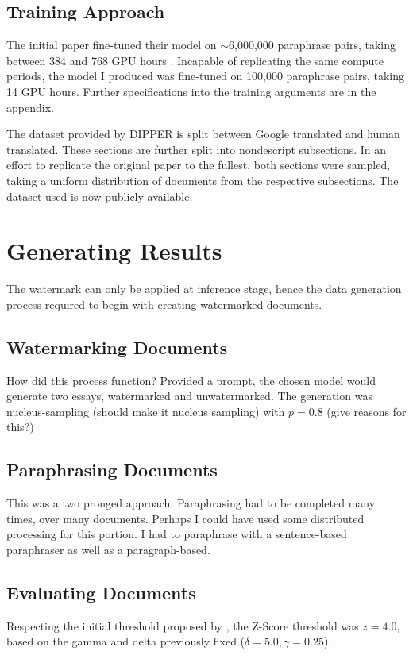 \documentclass{l4proj}
\theoremstyle{definition}
\begin{document}
    \subsection{Training Approach}
        The initial paper fine-tuned their model on $\sim$6,000,000 paraphrase pairs, taking between 384 and 768 GPU hours \citep{krishna2023paraphrasing}. Incapable of replicating the same compute periods, the model I produced was fine-tuned on 100,000 paraphrase pairs, taking 14 GPU hours.
        Further specifications into the training arguments are in the appendix. %

        The dataset provided by DIPPER is split between Google translated and human translated. These sections are further split into nondescript subsections. In an effort to replicate the original paper to the fullest, both sections were sampled, taking a uniform distribution of documents from the respective subsections. 
        The dataset used is now publicly available.
        
\section{Generating Results} %
    The watermark can only be applied at inference stage, hence the data generation process required to begin with creating watermarked documents. 

    \subsection{Watermarking Documents}
        How did this process function? Provided a prompt, the chosen model would generate two essays, watermarked and unwatermarked. The generation was nucleus-sampling (should make it nucleus sampling) with $p = 0.8$ (give reasons for this?) \newline 

    \subsection{Paraphrasing Documents}
        This was a two pronged approach. Paraphrasing had to be completed many times, over many documents. Perhaps I could have used some distributed processing for this portion. 
        I had to paraphrase with a sentence-based paraphraser as well as a paragraph-based.

    \subsection{Evaluating Documents}
        Respecting the initial threshold proposed by \citet{kirchenbauer2023watermark}, the Z-Score threshold was $z = 4.0$, based on the gamma and delta previously fixed ($\delta = 5.0, \gamma = 0.25$). 
\end{document}
